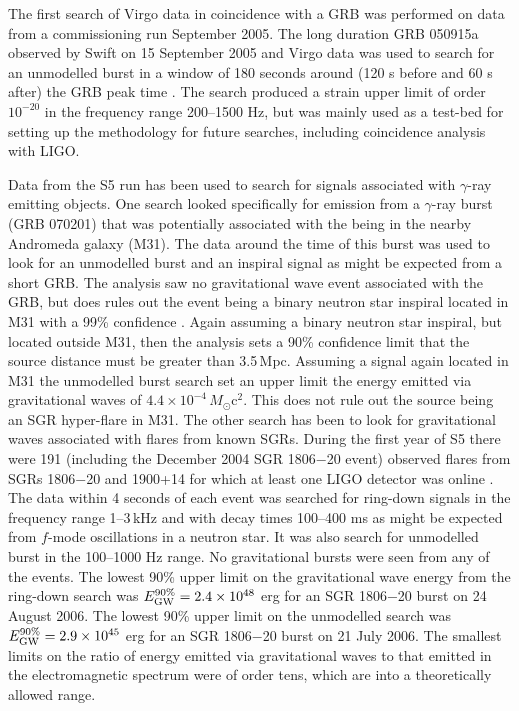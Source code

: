 \documentclass{article}
\begin{document}
The first search of Virgo data in coincidence with a GRB was performed on data
from a commissioning run September 2005. The long duration GRB 050915a observed
by Swift on 15 September 2005 and Virgo data was used to search for an unmodelled
burst in a window of 180 seconds around (120 s before and 60 s after) the GRB
peak time \cite{Acernese:2008a}. The search produced a strain upper limit of order
$10^{-20}$ in the frequency range 200--1500 Hz, but was mainly used as a test-bed
for setting up the methodology for future searches, including coincidence
analysis with LIGO.

Data from the S5 run has been used to search for signals associated with
$\gamma$-ray emitting objects. One search looked specifically for emission from
a $\gamma$-ray burst (GRB 070201) \cite{Golenetskii:2007a, Golenetskii:2007b}
that was potentially associated with the being in the nearby Andromeda galaxy
(M31). The data around the time of this burst was used to look for an
unmodelled burst and an inspiral signal as might be expected from a short GRB.
The analysis saw no gravitational wave event associated with the GRB, but does
rules out the event being a binary neutron star inspiral located in M31 with a
99\% confidence \cite{Abbott:2008g}. Again assuming a binary neutron star
inspiral, but located outside M31, then the analysis sets a 90\% confidence
limit that the source distance must be greater than 3.5\,Mpc. Assuming a signal
again located in M31 the unmodelled burst search set an upper limit the energy
emitted via gravitational waves of $4.4\times10^{-4}\,M_{\odot}$c$^2$. This
does not rule out the source being an SGR hyper-flare in M31. The other search
has been to look for gravitational waves associated with flares from known
SGRs. During the first year of S5 there were 191 (including the December 2004
SGR 1806$-$20 event) observed flares from SGRs 1806$-$20 and 1900+14 for which
at least one LIGO detector was online \cite{Abbott:2008h}. The data within 4
seconds of each event was searched for ring-down signals in the frequency range
1--3\,kHz and with decay times 100--400 ms as might be expected from $f$-mode
oscillations in a neutron star. It was also search for unmodelled burst in the
100--1000 Hz range. No gravitational bursts were seen from any of the events.
The lowest 90\% upper limit on the gravitational wave energy from the ring-down
search was $E_{\rm GW}^{90\%} = 2.4\times10^{48}$ erg for an SGR 1806$-$20
burst on 24 August 2006. The lowest 90\% upper limit on the unmodelled search
was $E_{\rm GW}^{90\%} = 2.9\times10^{45}$ erg for an SGR 1806$-$20
burst on 21 July 2006. The smallest limits on the ratio of energy emitted via
gravitational waves to that emitted in the electromagnetic spectrum were of
order tens, which are into a theoretically allowed range.
\end{document}
